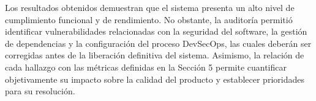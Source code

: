 Los resultados obtenidos demuestran que el sistema presenta un alto nivel de cumplimiento funcional y de rendimiento. No obstante, la auditoría permitió identificar vulnerabilidades relacionadas con la seguridad del software, la gestión de dependencias y la configuración del proceso DevSecOps, las cuales deberán ser corregidas antes de la liberación definitiva del sistema. Asimismo, la relación de cada hallazgo con las métricas definidas en la Sección 5 permite cuantificar objetivamente su impacto sobre la calidad del producto y establecer prioridades para su resolución.